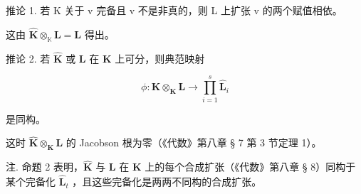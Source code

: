 推论 1. 若 K 关于 v 完备且 v 不是非真的，则 L 上扩张 v 的两个赋值相依。

这由 \(\hat{\mathbf{K}}\otimes_{\mathbb{K}}\mathbf{L} = \mathbf{L}\) 得出。

推论 2. 若 \(\hat{\mathbf{K}}\) 或 \(\mathbf{L}\) 在 \(\mathbf{K}\) 上可分，则典范映射

\[
\phi : \hat {\mathbf {K}} \otimes_ {\mathbf {K}} \mathbf {L} \rightarrow \prod_ {i = 1} ^ {s} \hat {\mathbf {L}} _ {i}
\]

是同构。

这时 \(\hat{\mathbf{K}}\otimes_{\mathbf{K}}\mathbf{L}\) 的 Jacobson 根为零（《代数》第八章 § 7 第 3 节定理 1）。

注. 命题 2 表明，\(\hat{\mathbf{K}}\) 与 \(\mathbf{L}\) 在 \(\mathbf{K}\) 上的每个合成扩张（《代数》第八章 § 8）同构于某个完备化 \(\hat{\mathbf{L}}_t\) ，且这些完备化是两两不同构的合成扩张。
